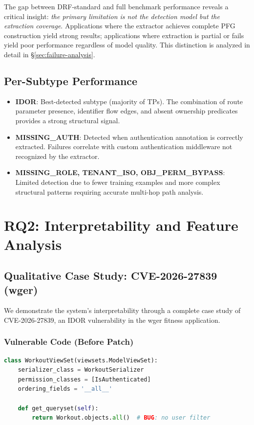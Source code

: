 The gap between DRF-standard and full benchmark performance reveals a critical insight: \emph{the primary limitation is not the detection model but the extraction coverage}. Applications where the extractor achieves complete PFG construction yield strong results; applications where extraction is partial or fails yield poor performance regardless of model quality. This distinction is analyzed in detail in \S\ref{sec:failure-analysis}.

\subsection{Per-Subtype Performance}

\begin{itemize}
    \item \textbf{IDOR}: Best-detected subtype (majority of TPs). The combination of route parameter presence, identifier flow edges, and absent ownership predicates provides a strong structural signal.
    \item \textbf{MISSING\_AUTH}: Detected when authentication annotation is correctly extracted. Failures correlate with custom authentication middleware not recognized by the extractor.
    \item \textbf{MISSING\_ROLE, TENANT\_ISO, OBJ\_PERM\_BYPASS}: Limited detection due to fewer training examples and more complex structural patterns requiring accurate multi-hop path analysis.
\end{itemize}

\section{RQ2: Interpretability and Feature Analysis}
\label{sec:rq2}

\subsection{Qualitative Case Study: CVE-2026-27839 (wger)}

We demonstrate the system's interpretability through a complete case study of CVE-2026-27839, an IDOR vulnerability in the wger fitness application.

\subsubsection{Vulnerable Code (Before Patch)}

\begin{lstlisting}[language=Python, basicstyle=\small\ttfamily, frame=single, caption={wger WorkoutViewSet before patch}]
class WorkoutViewSet(viewsets.ModelViewSet):
    serializer_class = WorkoutSerializer
    permission_classes = [IsAuthenticated]
    ordering_fields = '__all__'

    def get_queryset(self):
        return Workout.objects.all()  # BUG: no user filter
\end{lstlisting}

